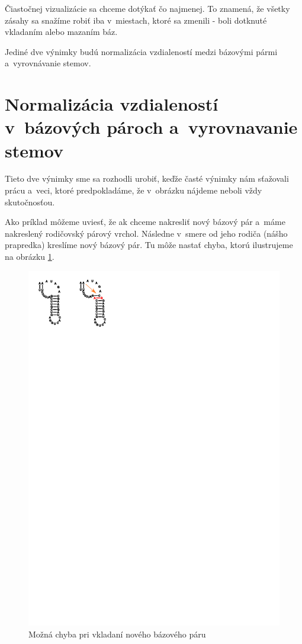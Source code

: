 Čiastočnej vizualizácie sa chceme dotýkať čo najmenej. To znamená, že všetky zásahy sa
snažíme robiť iba v~miestach, ktoré sa zmenili - boli dotknuté vkladaním alebo mazaním báz.

Jediné dve výnimky budú normalizácia vzdialeností medzi bázovými pármi a~vyrovnávanie stemov.





\section{Normalizácia vzdialeností v~bázových pároch a~vyrovnavanie stemov}

Tieto dve výnimky sme sa rozhodli urobiť, keďže časté výnimky nám sťažovali
prácu a~veci, ktoré predpokladáme, že v~obrázku nájdeme neboli vždy skutočnosťou.

Ako príklad môžeme uviesť, že ak chceme nakresliť nový bázový pár a~máme nakreslený
rodičovský párový vrchol. Následne v~smere od jeho rodiča (nášho prapredka) kreslíme nový
bázový pár. Tu môže nastať chyba, ktorú ilustrujeme na obrázku \ref{obr:insert_stem_error}.

\begin{figure}[H]
  \centering
  \includegraphics[clip, trim=0 24.5cm 14cm 0]{../img/alg/even_stem/error_insert}
  \caption{Možná chyba pri vkladaní nového bázového páru}
  \label{obr:insert_stem_error}
\end{figure}

